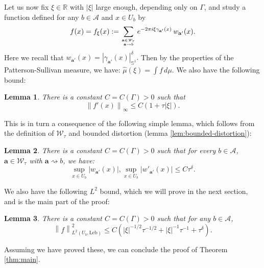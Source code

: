 \documentclass[12pt]{amsart}
\newcommand{\R}{\mathbb{R}}
\newcommand*\abs[1]{
	\left|#1\right|
}
\newcommand*\Leb{
	\mathrm{Leb}
}
\newcommand{\norm}[1]{\left\lVert#1\right\rVert}
\newtheorem{lem}{Lemma}[section]
\theoremstyle{definition}
\renewcommand{\leq}{\leqslant}
\begin{document}
Let us now fix $\xi \in \R$ with $\abs{\xi}$ large enough, depending only on $\Gamma$, and study a function defined for any $b \in \mathcal{A}$ and $x \in U_b$ by
\begin{equation}\label{eq:F-def}
f(x) = f_\xi(x) 
:=
\sum_{\mathbf{a}\in\mathscr{W}_\tau \atop \mathbf{a} \rightsquigarrow b}
e^{-2\pi i\xi\gamma_{\mathbf{a}'}(x)}\,w_{\mathbf{a}'}(x).
\end{equation}
Here we recall that $w_{\mathbf{a}'}(x) = \abs{\gamma_{\mathbf{a}'}(x)}_{\mathbb{S}^1}^\delta.$
Then by the properties of the Patterson-Sullivan measure, we have:
$\widehat{\mu}(\xi)=\int f\,d\mu.$
We also have the following bound:
\begin{lem}
\label{lem:bound-derivative-f}
    There is a constant $C = C(\Gamma) > 0$ such that
    \[\norm{f'(x)}_\infty \leq C(1 + \tau\abs{\xi}).\]
\end{lem}
This is in turn a consequence of the following simple lemma, which follows from the definition of $\mathcal{W}_\tau$ and bounded distortion (lemma \ref{lem:bounded-distortion}):
\begin{lem}
    \label{lem:bound-w}
    There is a constant $C = C(\Gamma) > 0$ such that for every $b \in \mathcal{A}$, $\mathbf{a} \in \mathcal{W}_\tau$ with $\mathbf{a} \rightsquigarrow b$, we have:
    \[\sup_{x\in U_b}\abs{w_{\mathbf{a}'}(x)}, \sup_{x\in U_b}\abs{w'_{\mathbf{a}'}(x)} \leq C\tau^\delta.\]
\end{lem}
We also have the following $L^2$ bound, which we will prove in the next section, and is the main part of the proof:
\begin{lem}\label{lma:L2}
    There is a constant $C = C(\Gamma) > 0$ such that for any $b\in\mathcal{A}$,
    \[\norm{f}_{L^2(U_b, \Leb)}^2 \leq C\left( \abs{\xi}^{-1/2}\tau^{-1/2} + \abs{\xi}^{-1}\tau^{-1} +\tau^\delta\right).\]
\end{lem}
Assuming we have proved these, we can conclude the proof of Theorem \ref{thm:main}.
\end{document}
